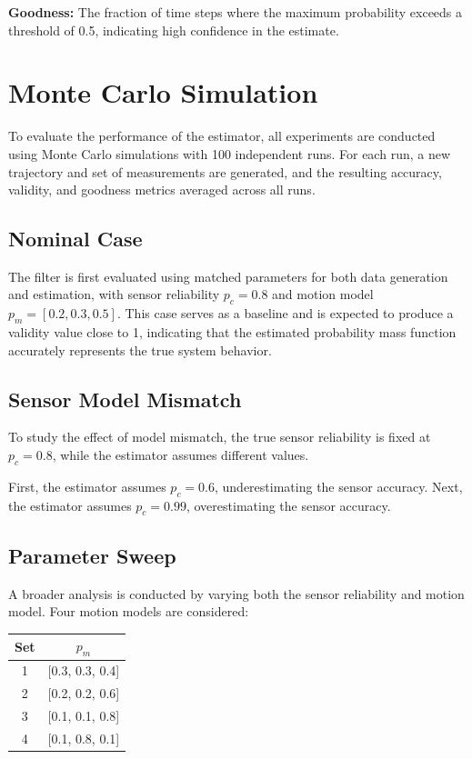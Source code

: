 \documentclass[11pt, letterpaper, twocolumn]{article}
\begin{document}
\textbf{Goodness:} The fraction of time steps where the maximum probability exceeds
a threshold of 0.5, indicating high confidence in the estimate.

\section*{Monte Carlo Simulation}

To evaluate the performance of the estimator, all experiments are conducted using
Monte Carlo simulations with 100 independent runs. For each run, a new trajectory
and set of measurements are generated, and the resulting accuracy, validity, and
goodness metrics averaged across all runs.

\subsection*{Nominal Case}

The filter is first evaluated using matched parameters for both data generation and
estimation, with sensor reliability $p_c = 0.8$ and motion model $p_m = [0.2, 0.3, 0.5]$.
This case serves as a baseline and is expected to produce a validity value close to 1,
indicating that the estimated probability mass function accurately represents the 
true system behavior.

\subsection*{Sensor Model Mismatch}

To study the effect of model mismatch, the true sensor reliability is fixed at $p_c = 0.8$,
while the estimator assumes different values.

First, the estimator assumes $p_c = 0.6$, underestimating the sensor accuracy. Next,
the estimator assumes $p_c = 0.99$, overestimating the sensor accuracy.

\subsection*{Parameter Sweep}

A broader analysis is conducted by varying both the sensor reliability and 
motion model. Four motion models are considered:

\begin{center}
    \begin{tabular}{c c}
        \hline
        Set & $p_m$ \\
        \hline
        1 & [0.3, 0.3, 0.4] \\
        2 & [0.2, 0.2, 0.6] \\
        3 & [0.1, 0.1, 0.8] \\
        4 & [0.1, 0.8, 0.1] \\
        \hline
    \end{tabular}
\end{center}
\end{document}
